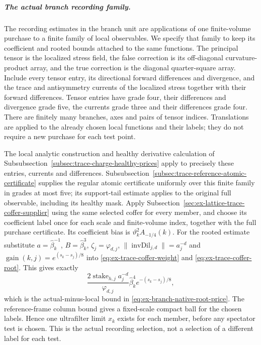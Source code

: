 \subparagraph{The actual branch recording family.}
The recording estimates in the branch unit are applications of one
finite-volume purchase to a finite family of local observables. We
specify that family to keep its coefficient and rooted bounds attached
to the same functions. The principal tensor is the localized stress
field, the false correction is its off-diagonal curvature-product
array, and the true correction is the diagonal quarter-square array.
Include every tensor entry, its directional forward differences and
divergence, and the trace and antisymmetry currents of the localized
stress together with their forward differences. Tensor entries have
grade four, their differences and divergence grade five, the currents
grade three and their differences grade four. There are finitely many
branches, axes and pairs of tensor indices. Translations are applied to
the already chosen local functions and their labels; they do not
require a new purchase for each test point.

The local analytic construction and healthy derivative calculation of
Subsubsection~\ref{subsec:trace-charge-healthy-prices} apply to precisely these
entries, currents and differences. Subsubsection~\ref{subsec:trace-reference-atomic-certificate} supplies the
regular atomic certificate uniformly over this finite family in grades
at most five; its support-tail estimate applies to the original full
observable, including its healthy mask. Apply Subsection~\ref{sec:ex-lattice-trace-coffer-supplier} using the same
selected coffer for every member, and choose its coefficient label
once for each scale and finite-volume index, together with the full
purchase certificate. Its coefficient bias is
$\vartheta_k^2 A_{-1/4}(k)$. For the rooted estimate substitute
$a=\widehat\beta_k^{-1}$, $B=\widehat\beta_k^3$,
$\zeta_j=\varphi_{d,j}$, $\|\operatorname{invDil}_{j,d}\|=a_j^{-d}$
and $\operatorname{gain}(k,j)=e^{(s_k-s_j)/8}$ into
\eqref{eq:ex-trace-coffer-weight} and
\eqref{eq:ex-trace-coffer-root}. This gives exactly
\[
 \frac{2\operatorname{stake}_{h,j}a_j^{-d}}{\varphi_{d,j}}
       \widehat\beta_k^4e^{-(s_k-s_j)/8},
\]
which is the actual-minus-local bound in \eqref{eq:ex-branch-native-root-price}. The reference-frame column
bound gives a fixed-scale compact ball for the chosen labels. Hence
one ultrafilter limit $x_k$ exists for each member, before any
spectator test is chosen. This is the actual recording selection,
not a selection of a different label for each test.

